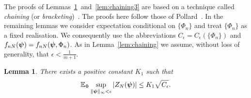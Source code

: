 \documentclass[aap]{imsart}
\newcommand{\expect}{{\mathbb E}}
\newcommand{\abs}[1]{\left\vert #1 \right\vert}
\newtheorem{lemma}{Lemma}
\begin{document}
The proofs of Lemmas~\ref{lem:chaining2}~and~\ref{lem:chaining3} are based on a technique called \emph{chaining} (or \emph{bracketing})~\cite{Dudley_unif_central_lim_th_1999,Ossiander_clt_bracketing_1984,Pollard_asymp_empi_proc_1989,Pollard_new_ways_clts_1986,van2009empirical}.  The proofs here follow those of Pollard~\cite{Pollard_asymp_empi_proc_1989}.  In the remaining lemmas we consider expectation conditional on $\{\Phi_n\}$ and treat $\{\Phi_n\}$ as a fixed realisation. We consequently use the abbreviations $C_\epsilon = C_\epsilon(\{\Phi_n\})$ and $f_{nN}(\boldsymbol{\psi}) = f_{nN}(\boldsymbol{\psi}, \Phi_n)$.  As in Lemma~\ref{lem:chaining} we assume, without loss of generality, that $\epsilon < \tfrac{1}{m+1}$.  

\begin{lemma}\label{lem:chaining2}
There exists a positive constant $K_1$ such that
\[
\expect_\Phi \sup_{\|\psibf\|_{\infty} < \epsilon} \abs{ Z_N(\psibf) } \leq K_1 \sqrt{C_\epsilon}.
\]
\end{lemma}
\end{document}
